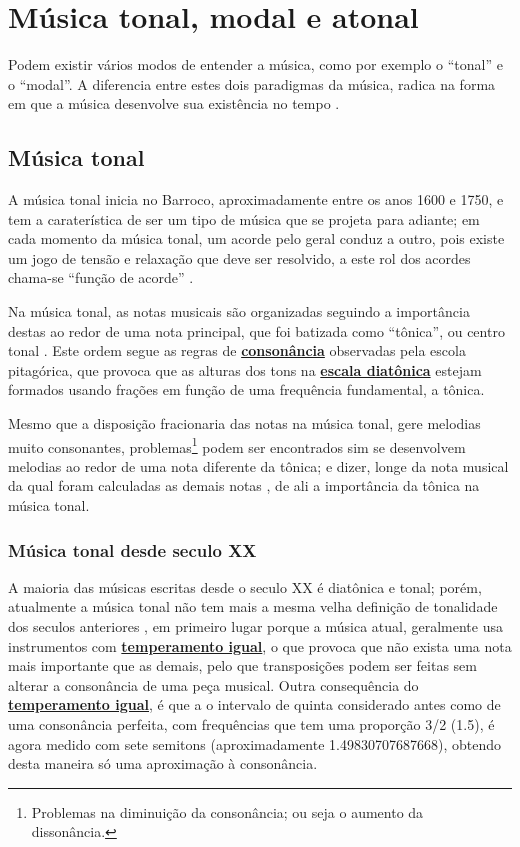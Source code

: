 
\section{Música tonal, modal e atonal}
\label{sec:ModosEntenderMusica}
Podem existir vários modos de entender a música, como por exemplo o ``tonal'' e o ``modal''.
A diferencia entre estes dois paradigmas da música, 
radica na forma em que a música desenvolve sua existência no tempo \cite[pp. 155]{arbones2012armonia}.


\subsection{Música tonal}
\label{sec:MusicaTonal}
A música tonal inicia no Barroco, aproximadamente entre os anos 1600 e 1750,
e tem a  caraterística de ser um tipo de  música que se projeta para adiante;
em cada momento da música tonal, um acorde pelo geral conduz a outro,
pois existe um jogo de tensão e relaxação que deve ser resolvido,
a este rol dos acordes chama-se ``função de acorde'' \cite[pp. 155-156]{arbones2012armonia}.


Na música tonal, 
as notas musicais são organizadas seguindo a importância destas ao redor de uma nota  principal,
que foi batizada como ``tônica'', ou centro tonal \cite[pp. 27]{arbones2012armonia}.
Este ordem segue as regras de \hyperref[ref:paginadiatonicanumerica]{\textbf{consonância}} observadas pela escola pitagórica,
que provoca que as alturas dos tons na \hyperref[sec:pos:Diatonica]{\textbf{escala diatônica}} 
estejam formados usando frações em função de uma frequência fundamental, a tônica.

Mesmo que a disposição fracionaria das notas na música tonal, gere melodias muito consonantes,
problemas\footnote{Problemas na diminuição da consonância; ou seja o aumento da dissonância.} 
podem ser encontrados sim se desenvolvem melodias ao redor de uma nota diferente da tônica;
e dizer, longe da nota musical da qual foram calculadas as demais notas \cite[pp. 28]{arbones2012armonia},
de ali a importância da tônica na música tonal.

\subsubsection{Música tonal desde seculo XX}
A maioria das músicas  escritas desde o seculo XX é diatônica e tonal;
porém, atualmente a música tonal não tem mais a mesma velha definição de tonalidade dos seculos anteriores  \cite[pp. 63]{copland1974ouvir},
em primeiro lugar porque a música atual, geralmente usa instrumentos com \hyperref[subsec:tempigual]{\textbf{temperamento igual}},
o que provoca que não exista uma nota mais importante que as demais, 
pelo que transposições podem ser feitas sem alterar a consonância de uma peça musical.
Outra consequência do \hyperref[subsec:tempigual]{\textbf{temperamento igual}},
é que a o intervalo de quinta considerado antes como de uma consonância perfeita,
com frequências que tem uma proporção 3/2 (1.5), é agora medido com sete semitons (aproximadamente 1.49830707687668),
obtendo desta maneira só uma aproximação à consonância.\\




